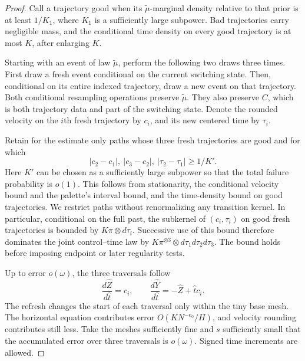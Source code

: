 \begin{proof}
Call a trajectory good when its \(\widetilde\mu\)-marginal
density relative to that prior is at least \(1/K_1\), where
\(K_1\) is a sufficiently large subpower.  Bad trajectories
carry negligible mass, and the conditional time density on every
good trajectory is at most \(K\), after enlarging \(K\).

Starting with an event of law \(\widetilde\mu\), perform the
following two draws three times.  First draw a fresh event conditional
on the current switching state.  Then, conditional on its entire
indexed trajectory, draw a new event on that trajectory.  Both
conditional resampling operations preserve \(\widetilde\mu\).
They also preserve \(C\), which is both trajectory data and part
of the switching state.  Denote the rounded velocity on the \(i\)th
fresh trajectory by \(c_i\), and its new centered time by
\(\tau_i\).

Retain for the estimate only paths whose three fresh trajectories are
good and for which
\[
 |c_2-c_1|,\ |c_3-c_2|,\ |\tau_2-\tau_1|\ge1/K'.
\]
Here \(K'\) can be chosen as a sufficiently large subpower so
that the total failure probability is \(o(1)\).  This follows
from stationarity, the conditional velocity bound and the palette's
interval bound, and the time-density bound on good trajectories.
We restrict paths without renormalizing any transition kernel.
In particular, conditional on the full past, the subkernel of
\((c_i,\tau_i)\) on good fresh trajectories is bounded by
\(K\pi\otimes d\tau_i\).  Successive use of this bound
therefore dominates the joint control--time law by
\(K\pi^{\otimes3}\otimes d\tau_1d\tau_2d\tau_3\).
The bound holds before imposing endpoint or later regularity tests.

Up to error \(o(\omega)\), the three traversals follow
\[
 \frac{d\widehat Z}{d\widehat t}=c_i,
 \qquad
 \frac{d\widehat Y}{d\widehat t}=-\widehat Z+\widehat t c_i.
\]
The refresh changes the start of each traversal only within the tiny
base mesh.  The horizontal equation contributes error
\(O(KN^{-e_0}/H)\), and velocity rounding contributes still
less.  Take the meshes sufficiently fine and \(s\) sufficiently
small that the accumulated error over three traversals is
\(o(\omega)\).  Signed time increments are allowed.


\end{proof}
